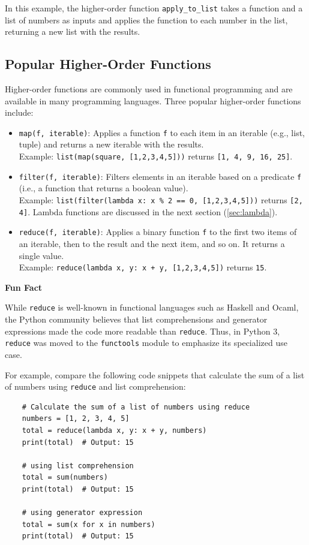 \documentclass[oneside,11pt,dvipsnames]{book}
\newenvironment{historybox}[1][]{
  \small
  \begin{myhistorybox}
    {\small \textbf{#1}}
  }{
  \end{myhistorybox}
}
\newcommand{\code}[1]{\texttt{#1}}
\begin{document}
In this example, the higher-order function \code{apply\_to\_list} takes a function and a list of numbers as inputs and applies the function to each number in the list, returning a new list with the results. 


\subsection{Popular Higher-Order Functions}

Higher-order functions are commonly used in functional programming and are available in many programming languages. Three popular higher-order functions include:

\begin{itemize}
    \item \code{map(f, iterable)}: Applies a function \code{f} to each item in an iterable (e.g., list, tuple) and returns a new iterable with the results.\\
    Example: \code{list(map(square, [1,2,3,4,5]))} returns \code{[1, 4, 9, 16, 25]}.
    \item \code{filter(f, iterable)}: Filters elements in an iterable based on a predicate \code{f} (i.e., a function that returns a boolean value).\\
    Example: \code{list(filter(lambda x: x \% 2 == 0, [1,2,3,4,5]))} returns \code{[2, 4]}. Lambda functions are discussed in the next section (\autoref{sec:lambda}).
    \item \code{reduce(f, iterable)}: Applies a binary function \code{f} to the first two items of an iterable, then to the result and the next item, and so on. It returns a single value.\\
    Example: \code{reduce(lambda x, y: x + y, [1,2,3,4,5])} returns \code{15}. 
\end{itemize}

\begin{historybox}[Fun Fact] 
    While \code{reduce} is well-known in functional languages such as Haskell and Ocaml, the Python community believes that list comprehensions and generator expressions made the code more readable than \code{reduce}. Thus, in Python 3, \code{reduce} was moved to the \code{functools} module to emphasize its specialized use case.

    For example, compare the following code snippets that calculate the sum of a list of numbers using \code{reduce} and list comprehension:
    \begin{lstlisting}
    # Calculate the sum of a list of numbers using reduce
    numbers = [1, 2, 3, 4, 5]
    total = reduce(lambda x, y: x + y, numbers)
    print(total)  # Output: 15
    
    # using list comprehension
    total = sum(numbers)
    print(total)  # Output: 15
    
    # using generator expression
    total = sum(x for x in numbers)
    print(total)  # Output: 15
    \end{lstlisting}    
\end{historybox}
\end{document}
